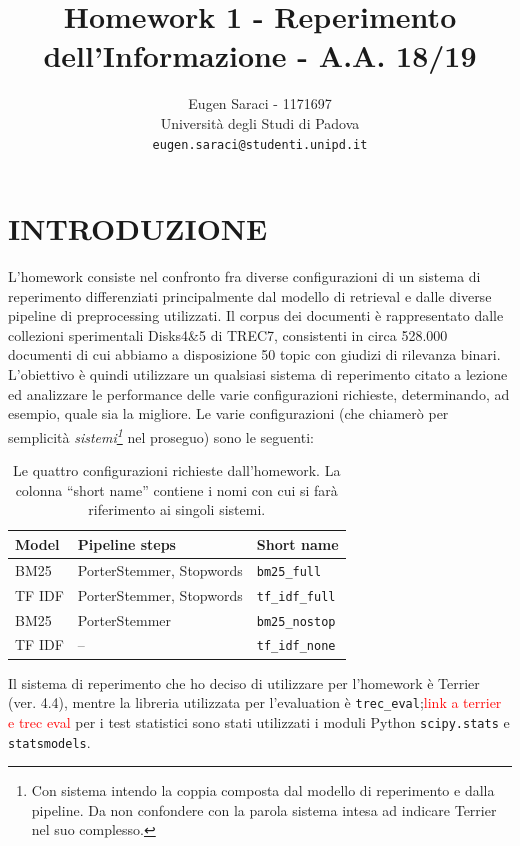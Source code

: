 \documentclass[letterpaper, 10 pt, conference]{ieeeconf}  %
\title{\LARGE \bf
Homework 1 - Reperimento dell'Informazione - A.A. 18/19
}
\author{Eugen Saraci - 1171697 \\ 
        Università degli Studi di Padova\\
        {\tt\small eugen.saraci@studenti.unipd.it}%
}
\newcommand\todo[1]{\textcolor{red}{#1}}
\begin{document}
\maketitle
\thispagestyle{empty}
\pagestyle{empty}


\section{INTRODUZIONE}
L'homework consiste nel confronto fra diverse configurazioni di un sistema di reperimento differenziati principalmente dal modello di retrieval e dalle diverse pipeline di preprocessing utilizzati. Il corpus dei documenti è rappresentato dalle collezioni sperimentali Disks4\&5 di TREC7, consistenti in circa 528.000 documenti di cui abbiamo a disposizione 50 topic con giudizi di rilevanza binari. L'obiettivo è quindi utilizzare un qualsiasi sistema di reperimento citato a lezione ed analizzare le performance delle varie configurazioni richieste, determinando, ad esempio, quale sia la migliore.
\noindent
Le varie configurazioni (che chiamerò per semplicità \textit{sistemi\footnote{Con sistema intendo la coppia composta dal modello di reperimento e dalla pipeline. Da non confondere con la parola sistema intesa ad indicare Terrier nel suo complesso.}} nel proseguo) sono le seguenti:

\begin{table}[h]
\centering
\begin{tabular}{|l|l|l|}
\hline
\textbf{Model} & \textbf{Pipeline steps}        & \textbf{Short name} \\ \hline
BM25                            & PorterStemmer, Stopwords & \texttt{bm25\_full}          \\ 
TF IDF                          & PorterStemmer, Stopwords & \texttt{tf\_idf\_full}       \\ 
BM25                            & PorterStemmer            & \texttt{bm25\_nostop}        \\
TF IDF                          & --                       & \texttt{tf\_idf\_none}       \\ \hline 
\end{tabular}
\caption{Le quattro configurazioni richieste dall'homework. La colonna ``short name'' contiene i nomi con cui si farà riferimento ai singoli sistemi.}
\label{tab:systems}
\end{table}

Il sistema di reperimento che ho deciso di utilizzare per l'homework è Terrier (ver. 4.4), mentre la libreria utilizzata per l'evaluation è \texttt{trec\_eval};\todo{link a terrier e trec eval} per i test statistici sono stati utilizzati i moduli Python \texttt{scipy.stats}\cite{scipy} e \texttt{statsmodels}\cite{statsmodels}.
\end{document}
